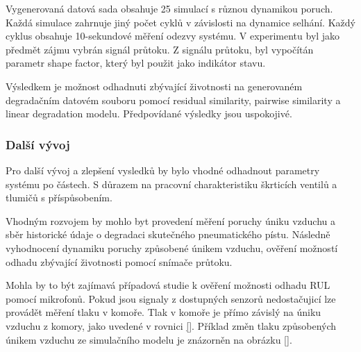 Vygenerovaná datová sada obsahuje 25 simulací s různou dynamikou poruch.
Každá simulace zahrnuje jiný počet cyklů v závislosti
na dynamice selhání. Každý cyklus
obsahuje 10-sekundové měření odezvy systému. V
experimentu byl jako předmět zájmu vybrán signál průtoku. Z
signálu průtoku, byl vypočítán parametr shape factor, který byl použit jako
indikátor stavu.

Výsledkem je možnost odhadnuti zbývající životnosti
na generovaném degradačním datovém souboru pomocí residual
similarity,  pairwise similarity a linear degradation modelu.
Předpovídané výsledky jsou uspokojivé.

\subsubsection*{Další vývoj}

Pro další vývoj a zlepšení vysledků by bylo vhodné odhadnout
parametry systému po částech. S důrazem na
pracovní charakteristiku škrticích ventilů a tlumičů s příspůsobením.

Vhodným rozvojem by mohlo byt provedení měření poruchy úniku vzduchu a sběr
historické údaje o degradaci skutečného pneumatického pístu.
Následně vyhodnocení dynamiku poruchy způsobené únikem vzduchu,  
ověření možností odhadu zbývající životnosti pomocí snímače průtoku.

Mohla by to být zajímavá případová studie k ověření možnosti odhadu RUL
pomocí mikrofonů. Pokud jsou signaly z dostupných senzorů nedostačujicí
lze provádět měření tlaku v komoře. Tlak v
komoře je přímo závislý na úniku vzduchu z komory, jako
uvedené v rovnici \ref{}. Příklad změn tlaku způsobených únikem vzduchu ze
simulačního modelu je znázorněn na obrázku \ref{}.
